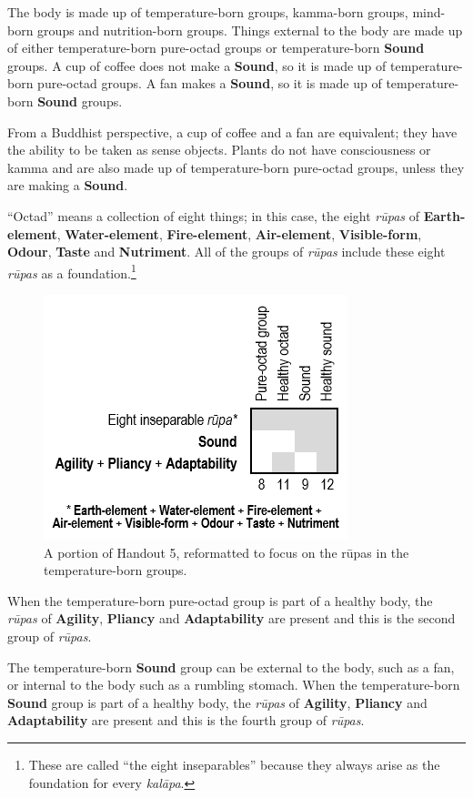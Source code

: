 The body is made up of temperature-born groups, kamma-born groups, mind-born groups and nutrition-born groups. Things external to the body are made up of either temperature-born pure-octad groups or temperature-born \textbf{Sound} groups. A cup of coffee does not make a \textbf{Sound}, so it is made up of temperature-born pure-octad groups. A fan makes a \textbf{Sound}, so it is made up of temperature-born \textbf{Sound} groups.

From a Buddhist perspective, a cup of coffee and a fan are equivalent; they have the ability to be taken as sense objects. Plants do not have consciousness or kamma and are also made up of temperature-born pure-octad groups, unless they are making a \textbf{Sound}.

“Octad” means a collection of eight things; in this case, the eight \textit{rūpas} of \textbf{Earth-element}, \textbf{Water-element}, \textbf{Fire-element}, \textbf{Air-element}, \textbf{Visible-form}, \textbf{Odour}, \textbf{Taste} and \textbf{Nutriment}. All of the groups of \textit{rūpas} include these eight \textit{rūpas} as a foundation.\footnote{These are called “the eight inseparables” because they always arise as the foundation for every \textit{kalāpa}.}

\begin{figure}[h]
\centering
\includegraphics[width=0.5\linewidth]{./Diagrams/TempG}
\caption{A portion of Handout 5, reformatted to focus on the rūpas in the temperature-born groups.}
\label{fig:TempG}
\end{figure}

When the temperature-born pure-octad group is part of a healthy body, the \textit{rūpas} of \textbf{Agility}, \textbf{Pliancy} and \textbf{Adaptability} are present and this is the second group of \textit{rūpas}.

The temperature-born \textbf{Sound} group can be external to the body, such as a fan, or internal to the body such as a rumbling stomach. When the temperature-born \textbf{Sound} group is part of a healthy body, the \textit{rūpas} of \textbf{Agility}, \textbf{Pliancy} and \textbf{Adaptability} are present and this is the fourth group of \textit{rūpas}.

